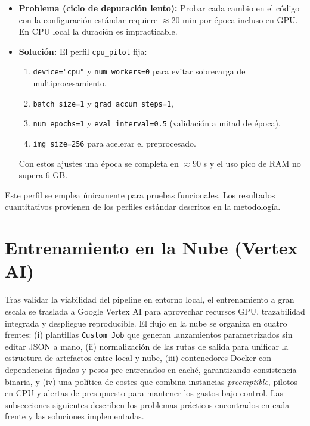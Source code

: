 \begin{itemize}
   \item \textbf{Problema (ciclo de depuración lento):}
   Probar cada cambio en el código con la configuración estándar requiere \(\approx 20\) min por época incluso en GPU.
   En CPU local la duración es impracticable.
   \item \textbf{Solución:}
   El perfil \texttt{cpu\_pilot} fija:
         \begin{enumerate}
            \item \texttt{device="cpu"} y \texttt{num\_workers=0} para evitar sobrecarga de multiprocesamiento,
            \item \texttt{batch\_size=1} y \texttt{grad\_accum\_steps=1},
            \item \texttt{num\_epochs=1} y \texttt{eval\_interval=0.5} (validación a mitad de época),
            \item \texttt{img\_size=256} para acelerar el preprocesado.
         \end{enumerate}
         Con estos ajustes una época se completa en \(\approx 90\) s y el uso pico de RAM no supera 6 GB.
\end{itemize}

Este perfil se emplea únicamente para pruebas funcionales.
Los resultados cuantitativos provienen de los perfiles estándar descritos en la metodología.

\section{Entrenamiento en la Nube (Vertex AI)}\label{sec:vertex_ai}

Tras validar la viabilidad del pipeline en entorno local, el entrenamiento a gran escala se traslada a Google Vertex AI para aprovechar recursos GPU, trazabilidad integrada y despliegue reproducible.
El flujo en la nube se organiza en cuatro frentes: (i) plantillas \texttt{Custom Job} que generan lanzamientos parametrizados sin editar JSON a mano,
(ii) normalización de las rutas de salida para unificar la estructura de artefactos entre local y nube,
(iii) contenedores Docker con dependencias fijadas y pesos pre-entrenados en caché, garantizando consistencia binaria,
y (iv) una política de costes que combina instancias \emph{preemptible}, pilotos en CPU y alertas de presupuesto para mantener los gastos bajo control.
Las subsecciones siguientes describen los problemas prácticos encontrados en cada frente y las soluciones implementadas.


